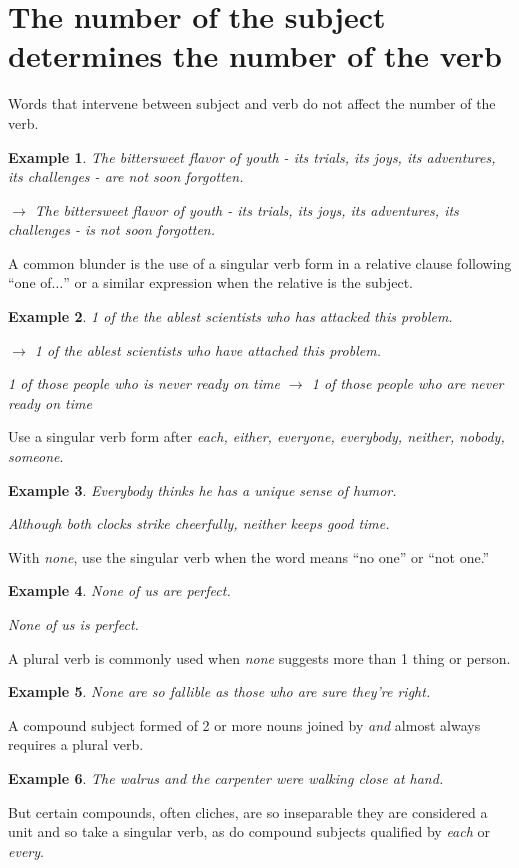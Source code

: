 \documentclass{book}
\numberwithin{equation}{section}
\newtheorem{example}{Example}[chapter]
\begin{document}
\section{The number of the subject determines the number of the verb}
Words that intervene between subject and verb do not affect the number of the verb.
\begin{example}
    The bittersweet flavor of youth - its trials, its joys, its adventures, its challenges - are not soon forgotten.
    
    $\to$ The bittersweet flavor of youth - its trials, its joys, its adventures, its challenges - is not soon forgotten.
\end{example}
A common blunder is the use of a singular verb form in a relative clause following ``one of$\ldots$'' or a similar expression when the relative is the subject.
\begin{example}
    1 of the the ablest scientists who has attacked this problem.
    
    $\to$ 1 of the ablest scientists who have attached this problem.
    
    1 of those people who is never ready on time $\to$ 1 of those people who are never ready on time
\end{example}
Use a singular verb form after \textit{each, either, everyone, everybody, neither, nobody, someone}.
\begin{example}
    Everybody thinks he has a unique sense of humor.
    
    Although both clocks strike cheerfully, neither keeps good time.
\end{example}
With \textit{none}, use the singular verb when the word means ``no one'' or ``not one.''
\begin{example}
    None of us are perfect.
    
    None of us is perfect.
\end{example}
A plural verb is commonly used when \textit{none} suggests more than 1 thing or person.
\begin{example}
    None are so fallible as those who are sure they're right.
\end{example}
A compound subject formed of 2 or more nouns joined by \textit{and} almost always requires a plural verb.
\begin{example}
    The walrus and the carpenter were walking close at hand.
\end{example}
But certain compounds, often cliches, are so inseparable they are considered a unit and so take a singular verb, as do compound subjects qualified by \textit{each} or \textit{every}.
\end{document}
